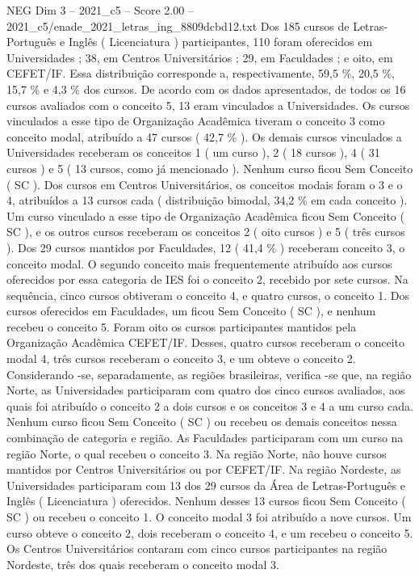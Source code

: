 \begin{textsample}{NEG Dim 3 – 2021\_c5 – Score 2.00 – 2021\_c5/enade\_2021\_letras\_ing\_8809dcbd12.txt}
Dos 185 cursos de Letras-Português e Inglês ( Licenciatura ) participantes, 110 foram oferecidos em Universidades ; 38, em Centros Universitários ; 29, em Faculdades ; e oito, em CEFET/IF.
Essa distribuição corresponde a, respectivamente, 59,5 \%, 20,5 \%, 15,7 \% e 4,3 \% dos cursos.
De acordo com os dados apresentados, de todos os 16 cursos avaliados com o conceito 5, 13 eram vinculados a Universidades.
Os cursos vinculados a esse tipo de Organização Acadêmica tiveram o conceito 3 como conceito modal, atribuído a 47 cursos ( 42,7 \% ).
Os demais cursos vinculados a Universidades receberam os conceitos 1 ( um curso ), 2 ( 18 cursos ), 4 ( 31 cursos ) e 5 ( 13 cursos, como já mencionado ).
Nenhum curso ficou Sem Conceito ( SC ).
Dos cursos em Centros Universitários, os conceitos modais foram o 3 e o 4, atribuídos a 13 cursos cada ( distribuição bimodal, 34,2 \% em cada conceito ).
Um curso vinculado a esse tipo de Organização Acadêmica ficou Sem Conceito ( SC ), e os outros cursos receberam os conceitos 2 ( oito cursos ) e 5 ( três cursos ).
Dos 29 cursos mantidos por Faculdades, 12 ( 41,4 \% ) receberam conceito 3, o conceito modal.
O segundo conceito mais frequentemente atribuído aos cursos oferecidos por essa categoria de IES foi o conceito 2, recebido por sete cursos.
Na sequência, cinco cursos obtiveram o conceito 4, e quatro cursos, o conceito 1.
Dos cursos oferecidos em Faculdades, um ficou Sem Conceito ( SC ), e nenhum recebeu o conceito 5.
Foram oito os cursos participantes mantidos pela Organização Acadêmica CEFET/IF.
Desses, quatro cursos receberam o conceito modal 4, três cursos receberam o conceito 3, e um obteve o conceito 2.
Considerando -se, separadamente, as regiões brasileiras, verifica -se que, na região Norte, as Universidades participaram com quatro dos cinco cursos avaliados, aos quais foi atribuído o conceito 2 a dois cursos e os conceitos 3 e 4 a um curso cada.
Nenhum curso ficou Sem Conceito ( SC ) ou recebeu os demais conceitos nessa combinação de categoria e região.
As Faculdades participaram com um curso na região Norte, o qual recebeu o conceito 3.
Na região Norte, não houve cursos mantidos por Centros Universitários ou por CEFET/IF.
Na região Nordeste, as Universidades participaram com 13 dos 29 cursos da Área de Letras-Português e Inglês ( Licenciatura ) oferecidos.
Nenhum desses 13 cursos ficou Sem Conceito ( SC ) ou recebeu o conceito 1.
O conceito modal 3 foi atribuído a nove cursos.
Um curso obteve o conceito 2, dois receberam o conceito 4, e um recebeu o conceito 5.
Os Centros Universitários contaram com cinco cursos participantes na região Nordeste, três dos quais receberam o conceito modal 3.

\end{textsample}
